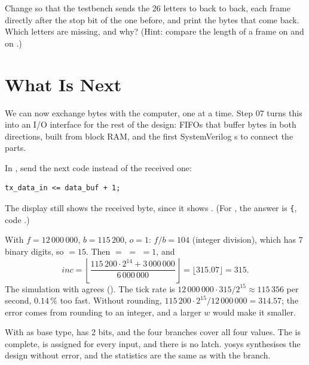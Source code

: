 \begin{exercise}
\label{ex:step06-tb}
Change  so that the testbench sends the 26 letters  to
 back to back, each frame directly after the stop bit of the one
before, and print the bytes that come back. Which letters are missing, and
why? (Hint: compare the length of a frame on  and on .)
\end{exercise}

\section{What Is Next}

We can now exchange bytes with the computer, one at a time. Step 07 turns this
into an I/O interface for the rest of the design: FIFOs that buffer bytes in
both directions, built from block RAM, and the first SystemVerilog
s to connect the parts.

\solutions

\solution
In , send the next code instead of the received one:
\begin{lstlisting}
tx_data_in <= data_buf + 1;
\end{lstlisting}
The display still shows the received byte, since it shows . (For
, the answer is \texttt{\{}, code .)

\solution
With $f = 12\,000\,000$, $b = 115\,200$, $o = 1$: $f / b = 104$ (integer
division), which has 7 binary digits, so  $= 15$. Then
 $=$  $=$  $= 1$, and
\[
  \mathit{inc} = \left\lfloor \frac{115\,200 \cdot 2^{14} + 3\,000\,000}{6\,000\,000}
  \right\rfloor = \lfloor 315.07 \rfloor = 315 .
\]
The simulation with  agrees (). The tick rate is $12\,000\,000 \cdot 315 / 2^{15} \approx 115\,356$ per
second, $0.14\,\%$ too fast. Without rounding, $115\,200 \cdot 2^{15} / 12\,000\,000
= 314.57$; the error comes from rounding to an integer, and a larger $w$ would
make it smaller.

\solution
With  as base type,  has 2 bits, and the four
branches cover all four values. The  is complete,  is
assigned for every input, and there is no latch. yosys synthesises the design
without error, and the statistics are the same as with the 
branch.

